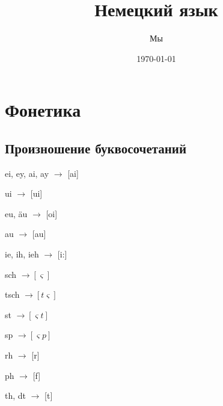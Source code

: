 \documentclass[oneside]{book}
\title{Немецкий язык}
\date{\today}
\author{Мы}
\begin{document}
	\maketitle

	\chapter{Фонетика}
	\section{Произношение буквосочетаний}
	ei, ey, ai, ay
	\begin{math}
		\longrightarrow
	\end{math}
	[ai]

	ui
	\begin{math}
		\longrightarrow
	\end{math}
	[ui]

	eu, \"au
	\begin{math}
		\longrightarrow
	\end{math}
	[oi]

	au
	\begin{math}
		\longrightarrow
	\end{math}
	[au]

	ie, ih, ieh
	\begin{math}
		\longrightarrow
	\end{math}
	[i:]

	sch
	\begin{math}
		\longrightarrow [\varsigma]
	\end{math}

	tsch
	\begin{math}
		\longrightarrow [t\varsigma]
	\end{math}

	st
	\begin{math}
		\longrightarrow [\varsigma t]
	\end{math}

	sp
	\begin{math}
		\longrightarrow [\varsigma p]
	\end{math}

	rh
	\begin{math}
		\longrightarrow
	\end{math}
	[r]

	ph
	\begin{math}
		\longrightarrow
	\end{math}
	[f]

	th, dt
	\begin{math}
		\longrightarrow
	\end{math}
	[t]
\end{document}
